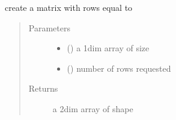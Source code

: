 \documentclass[letterpaper,10pt,english]{sphinxmanual}
\begin{document}
\begin{fulllineitems}
\label{\detokenize{ipfp_utils:ipfp_utils.nprepeat_row}}
create a matrix with  rows equal to 
\begin{quote}\begin{description}
\item[{Parameters}] \leavevmode\begin{itemize}
\item {} 
 () \textendash{} a 1\sphinxhyphen{}dim array of size 

\item {} 
 () \textendash{} number of rows requested

\end{itemize}

\item[{Returns}] \leavevmode
a 2\sphinxhyphen{}dim array of shape 

\end{description}\end{quote}

\end{fulllineitems}

\end{document}

